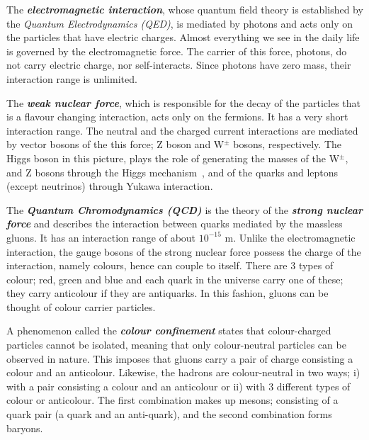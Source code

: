 The \textit{\textbf{electromagnetic interaction}}, whose quantum field theory is established by the \emph{Quantum Electrodynamics (QED)}, is mediated by photons and acts only on the particles that have electric charges.  Almost everything we see in the daily life is governed by the electromagnetic force. The carrier of this force, photons, do not carry electric charge, nor self-interacts. Since photons have zero mass, their interaction range is unlimited.

The \emph{\textbf{weak nuclear force}}, which is responsible for the decay of the particles that is a flavour changing interaction, acts only on the fermions. It has a very short interaction range. The neutral and the charged current interactions are mediated by vector bosons of the this force; Z boson and W$^{\pm}$ bosons, respectively. The Higgs boson in this picture, plays the role of generating the masses of the W$^{\pm}$, and Z bosons through the Higgs mechanism~\cite{Higgs1964, BroutEnglert, Guralnik1964}, and of the quarks and leptons (except neutrinos) through Yukawa interaction\cite{Weinberg1967}.

The \textbf{\emph{Quantum Chromodynamics (QCD)}} is the theory of the \textbf{\textit{strong nuclear force}} and describes the interaction between quarks mediated by the massless gluons. It has an interaction range of about $10^{-15}$ m. Unlike the electromagnetic interaction, the gauge bosons of the strong nuclear force possess the charge of the interaction, namely colours, hence can couple to itself. There are 3 types of colour; red, green and blue and each quark in the universe carry one of these; they carry anticolour if they are antiquarks. In this fashion, gluons can be thought of colour carrier particles.

A phenomenon called the \textbf{\emph{colour confinement}} states that colour-charged particles cannot be isolated, meaning that only colour-neutral particles can be observed in nature\footnotemark. This imposes that gluons carry a pair of charge consisting a colour and an anticolour. Likewise, the hadrons are colour-neutral in two ways; i) with a pair consisting a colour and an anticolour or ii) with 3 different types of colour or anticolour. The first combination makes up mesons; consisting of a quark pair (a quark and an anti-quark), and the second combination forms baryons.


